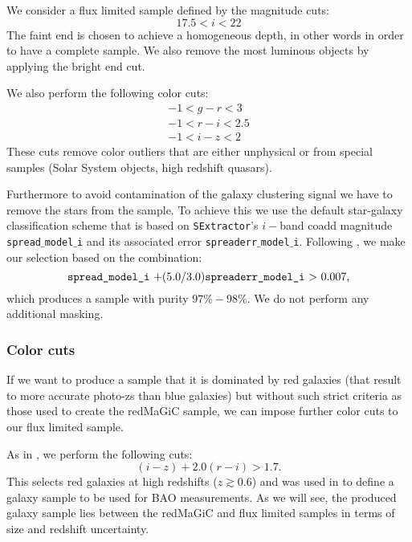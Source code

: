 \documentclass[a4paper,fleqn,usenatbib]{mnras}
\begin{document}
We consider a flux limited sample defined by the magnitude cuts:
\begin{equation}
17.5 < i <  22
\end{equation}
The faint end is chosen to achieve a homogeneous depth, in other words in order to have a complete sample. We also remove the most luminous objects by applying the bright end cut.

We also perform the following color cuts:
\begin{eqnarray}
-1  <  g - r  <  3\\
-1  <  r- i  < 2.5\\
- 1 < i - z < 2
\end{eqnarray}
These cuts remove color outliers that are either unphysical or from special samples (Solar System objects, high redshift quasars).

Furthermore to avoid contamination of the galaxy clustering signal we have to remove the stars from the sample. To achieve this we use the default star-galaxy classification scheme that is based on \texttt{SExtractor}'s $i-$band coadd magnitude \texttt{spread{$\_$}model{$\_$}i} and its associated error \texttt{spreaderr{$\_$}model{$\_$}i}. Following \citealt{Crocce2017},  we make our selection based on the combination:
\begin{equation}
\mbox{\texttt{spread{$\_$}model{$\_$}i} +(5.0/3.0)\texttt{spreaderr{$\_$}model{$\_$}i} > 0.007}, 
\end{equation}
which produces a sample with purity $97\% - 98\%$. We do not perform any additional masking. 


\subsubsection{Color cuts}
\label{subsubsec: Color_cuts}

If we want to produce a sample that it is dominated by red galaxies (that result to more accurate photo-zs than blue galaxies) but without such strict criteria as those used to create the redMaGiC sample, we can impose further color cuts to our flux limited sample.

As in \citep{Crocce2017}, we perform the following cuts:
\begin{equation}
(i-z) +2.0(r-i) >1.7.
\end{equation}
This selects red galaxies at high redshifts ($ z \gtrsim 0.6$) and was used in  \citep{Crocce2017} to define a galaxy sample to be used for BAO measurements. As we will see, the produced galaxy sample lies between the redMaGiC and flux limited samples in terms of size and redshift uncertainty.
\end{document}

